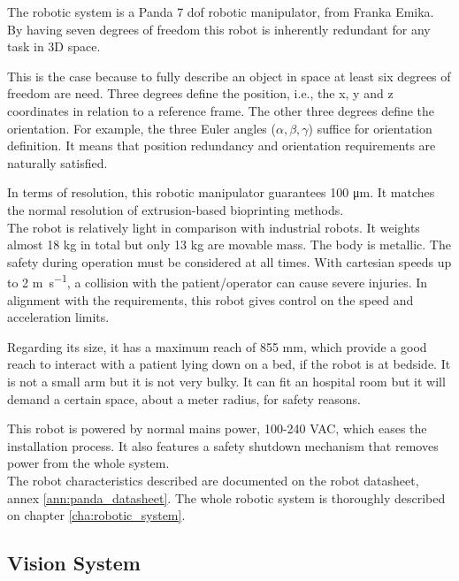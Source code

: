 The robotic system is a Panda 7 \gls{dof} robotic manipulator, from Franka Emika. By having seven degrees of freedom this robot is inherently redundant for any task in 3D space.

This is the case because to fully describe an object in space at least six degrees of freedom are need. Three degrees define the position, i.e., the x, y and z coordinates in relation to a reference frame. The other three degrees define the orientation. For example, the three Euler angles ($\alpha, \beta, \gamma$) suffice for orientation definition. It means that position redundancy and orientation requirements are naturally satisfied.

In terms of resolution, this robotic manipulator guarantees 100 \si{\micro\meter}. It matches the normal resolution of extrusion-based bioprinting methods.\\

The robot is relatively light in comparison with industrial robots. It weights almost 18 kg in total but only 13 kg are movable mass. The body is metallic. The safety during operation must be considered at all times. With cartesian speeds up to 2 \si{\meter\per\second}, a collision with the patient/operator can cause severe injuries. In alignment with the requirements, this robot gives control on the speed and acceleration limits.

Regarding its size, it has a maximum reach of 855 mm, which provide a good reach to interact with a patient lying down on a bed, if the robot is at bedside. It is not a small arm but it is not very bulky. It can fit an hospital room but it will demand a certain space, about a meter radius, for safety reasons.

This robot is powered by normal mains power, 100-240 VAC, which eases the installation process. It also features a safety shutdown mechanism that removes power from the whole system. \\

The robot characteristics described are documented on the robot datasheet, annex \ref{ann:panda_datasheet}. The whole robotic system is thoroughly described on chapter \ref{cha:robotic_system}.


\subsection*{Vision System}
\label{subsec:system_architecture_components_vision_system}

